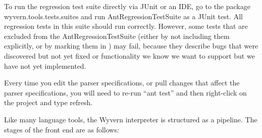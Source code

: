 \documentclass{article}
\begin{document}
\begin{mdP}[class={indent},data-line={34}]%
{}To run the regression test suite directly via JUnit or an IDE,
go to the package wyvern.tools.tests.suites and run
AntRegressionTestSuite as a JUnit test.  All regression tests
in this suite should run correctly.  However, some tests that
are excluded from the AntRegressionTestSuite (either by not
including them explicitly, or by marking them in
{}%
{}) may fail, because they
describe bugs that were discovered but not yet fixed or
functionality we know we want to support but we have
not yet implemented.%
\end{mdP}%
\begin{mdP}[class={indent},data-line={45}]%
{}Every time you edit the parser specifications, or pull changes
that affect the parser specifications, you will need to re-run
{}{\textquotedblleft}ant test{\textquotedblright}%
{} and then right-click on the project and type refresh.%
\end{mdP}%
\begin{mdP}[class={para-continue},data-line={54}]%
{}Like many language tools, the Wyvern interpreter is structured as a
pipeline.  The stages of the front end are as follows:%
\end{mdP}%
\end{document}
